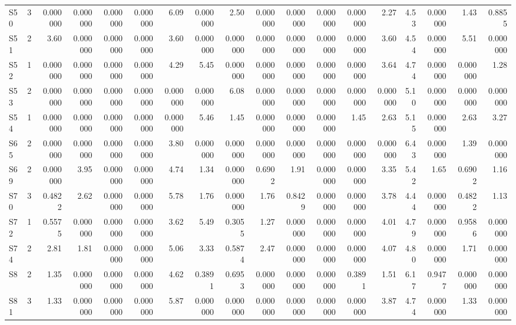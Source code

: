 {\begin{longtable}{lrrrrrrrrrrrrrrrrr}
  S50 & 3 & 0.000000 & 0.000000 & 0.000000 & 0.000000 & 6.09 & 0.000000 & 2.50 & 0.000000 & 0.000000 & 0.000000 & 0.000000 & 2.27 & 4.53 & 0.000000 & 1.43 & 0.8855 \\
  S51 & 2 & 3.60 & 0.000000 & 0.000000 & 0.000000 & 3.60 & 0.000000 & 0.000000 & 0.000000 & 0.000000 & 0.000000 & 0.000000 & 3.60 & 4.54 & 0.000000 & 5.51 & 0.000000 \\
  S52 & 1 & 0.000000 & 0.000000 & 0.000000 & 0.000000 & 4.29 & 5.45 & 0.000000 & 0.000000 & 0.000000 & 0.000000 & 0.000000 & 3.64 & 4.74 & 0.000000 & 0.000000 & 1.28 \\
  S53 & 2 & 0.000000 & 0.000000 & 0.000000 & 0.000000 & 0.000000 & 0.000000 & 6.08 & 0.000000 & 0.000000 & 0.000000 & 0.000000 & 0.000000 & 5.10 & 0.000000 & 0.000000 & 0.000000 \\
  S54 & 1 & 0.000000 & 0.000000 & 0.000000 & 0.000000 & 0.000000 & 5.46 & 1.45 & 0.000000 & 0.000000 & 0.000000 & 1.45 & 2.63 & 5.15 & 0.000000 & 2.63 & 3.27 \\
  S65 & 2 & 0.000000 & 0.000000 & 0.000000 & 0.000000 & 3.80 & 0.000000 & 0.000000 & 0.000000 & 0.000000 & 0.000000 & 0.000000 & 0.000000 & 6.43 & 0.000000 & 1.39 & 0.000000 \\
  S69 & 2 & 0.000000 & 3.95 & 0.000000 & 0.000000 & 4.74 & 1.34 & 0.000000 & 0.6902 & 1.91 & 0.000000 & 0.000000 & 3.35 & 5.42 & 1.65 & 0.6902 & 1.16 \\
  S70 & 3 & 0.4822 & 2.62 & 0.000000 & 0.000000 & 5.78 & 1.76 & 0.000000 & 1.76 & 0.8429 & 0.000000 & 0.000000 & 3.78 & 4.44 & 0.000000 & 0.4822 & 1.13 \\
  S72 & 1 & 0.5575 & 0.000000 & 0.000000 & 0.000000 & 3.62 & 5.49 & 0.3055 & 1.27 & 0.000000 & 0.000000 & 0.000000 & 4.01 & 4.79 & 0.000000 & 0.9586 & 0.000000 \\
  S74 & 2 & 2.81 & 1.81 & 0.000000 & 0.000000 & 5.06 & 3.33 & 0.5874 & 2.47 & 0.000000 & 0.000000 & 0.000000 & 4.07 & 4.80 & 0.000000 & 1.71 & 0.000000 \\
  S8 & 2 & 1.35 & 0.000000 & 0.000000 & 0.000000 & 4.62 & 0.3891 & 0.6953 & 0.000000 & 0.000000 & 0.000000 & 0.3891 & 1.51 & 6.17 & 0.9477 & 0.000000 & 0.000000 \\
  S81 & 3 & 1.33 & 0.000000 & 0.000000 & 0.000000 & 5.87 & 0.000000 & 0.000000 & 0.000000 & 0.000000 & 0.000000 & 0.000000 & 3.87 & 4.74 & 0.000000 & 1.33 & 0.000000 \\
\end{longtable}
}
